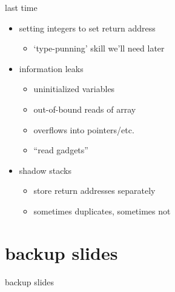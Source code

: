 \date{}
\title{}
\date{}

\begin{frame}
    \titlepage
\end{frame}



\begin{frame}{last time}
    \begin{itemize}
    \item setting integers to set return address
        \begin{itemize}
        \item `type-punning' skill we'll need later
        \end{itemize}
    \item information leaks
        \begin{itemize}
        \item uninitialized variables
        \item out-of-bound reads of array
        \item overflows into pointers/etc. 
        \item ``read gadgets''
        \end{itemize}
    \item shadow stacks
        \begin{itemize}
        \item store return addresses separately
        \item sometimes duplicates, sometimes not
        \end{itemize}
    \end{itemize}
\end{frame}



\section{backup slides}
\begin{frame}{backup slides}
\end{frame}


